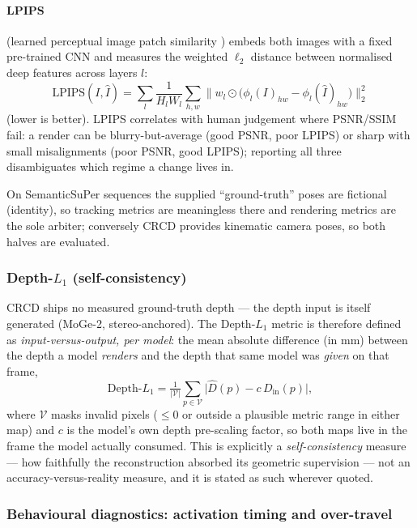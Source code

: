 \paragraph{LPIPS} (learned perceptual image patch similarity \cite{zhang2018lpips})
embeds both images with a fixed pre-trained CNN and measures the weighted
$\ell_2$ distance between normalised deep features across layers $l$:
\begin{equation}
  \mathrm{LPIPS}(I, \hat{I}) = \sum_l \frac{1}{H_l W_l} \sum_{h,w}
  \bigl\lVert w_l \odot \bigl( \phi_l(I)_{hw} - \phi_l(\hat{I})_{hw} \bigr) \bigr\rVert_2^2
\end{equation}
(lower is better). LPIPS correlates with human judgement where PSNR/SSIM fail:
a render can be blurry-but-average (good PSNR, poor LPIPS) or sharp with small
misalignments (poor PSNR, good LPIPS); reporting all three disambiguates which
regime a change lives in.

On SemanticSuPer sequences the supplied ``ground-truth'' poses are fictional
(identity), so tracking metrics are meaningless there and rendering metrics are
the sole arbiter; conversely CRCD provides kinematic camera poses, so both halves
are evaluated.

\subsubsection{Depth-$L_1$ (self-consistency)}
\label{sec:eval_depth}

CRCD ships no measured ground-truth depth --- the depth input is itself generated
(MoGe-2, stereo-anchored). The Depth-$L_1$ metric is therefore defined as
\emph{input-versus-output, per model}: the mean absolute difference (in mm)
between the depth a model \emph{renders} and the depth that same model was
\emph{given} on that frame,
\begin{equation}
  \mathrm{Depth}\text{-}L_1 = \tfrac{1}{|\mathcal{V}|} \sum_{p \in \mathcal{V}}
  \bigl| \hat{D}(p) - c\,D_{\mathrm{in}}(p) \bigr| ,
\end{equation}
where $\mathcal{V}$ masks invalid pixels ($\leq 0$ or outside a plausible metric
range in either map) and $c$ is the model's own depth pre-scaling factor, so both
maps live in the frame the model actually consumed. This is explicitly a
\emph{self-consistency} measure --- how faithfully the reconstruction absorbed its
geometric supervision --- not an accuracy-versus-reality measure, and it is stated
as such wherever quoted.

\subsubsection{Behavioural diagnostics: activation timing and over-travel}
\label{sec:eval_flowdiag}

